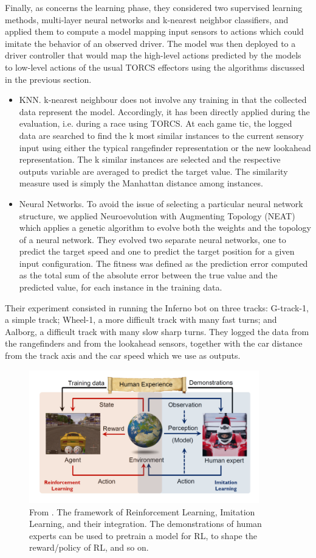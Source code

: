  
Finally, as concerns the learning phase, they considered two supervised learning methods, multi-layer neural networks and k-nearest neighbor classifiers, and applied them to compute a model mapping input sensors to actions which could imitate the behavior of an observed driver.
The model was then deployed to a driver controller
that would map the high-level actions predicted by the
models to low-level actions of the usual TORCS effectors
using the algorithms discussed in the previous section.
\begin{itemize}
\item{KNN.} k-nearest neighbour does not involve any training in that
the collected data represent the model. Accordingly, it has been directly applied during the evaluation, i.e. during a race using TORCS. At each game tic, the logged data are searched to find the k most similar instances to the current sensory input using either the typical rangefinder representation or the new lookahead representation. The k similar instances are selected and the respective outputs variable are averaged to predict the target value. The similarity measure used is simply the Manhattan distance among instances.
\item{Neural Networks.} To avoid the issue of selecting a particular
neural network structure, we applied Neuroevolution with Augmenting Topology (NEAT) \cite{neat} which applies a genetic algorithm to evolve both the weights and the topology of a neural network. They evolved two separate neural networks, one to predict the target speed and one to predict the target position for a given input configuration. The fitness was defined as the prediction error computed as the total sum of the absolute error between the true value and the predicted value, for each instance in the training data. 
\end{itemize}
Their experiment consisted in running the Inferno bot on three tracks: G-track-1, a simple track; Wheel-1, a more difficult track with many fast turns; and Aalborg, a difficult track with many slow sharp turns. They logged the data from the rangefinders and from the lookahead sensors, together with the car distance from the track axis and the car speed which we use
as outputs.


\begin{figure}[t]
 \centering
  \captionsetup{width=10cm}
  \includegraphics[width=10cm]{./img/cinesi}
  \caption{From \cite{cinesi}. The framework of Reinforcement Learning, Imitation Learning, and their integration. The demonstrations of human experts can be used to pretrain a model for RL, to shape the reward/policy of RL, and so on.}
\end{figure}

